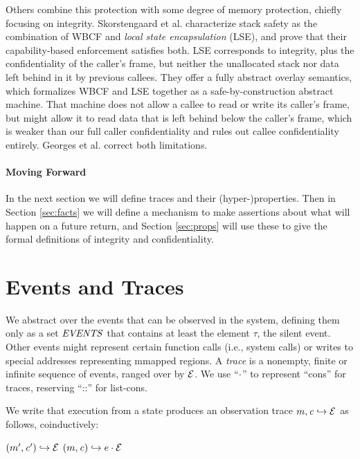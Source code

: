 \documentclass[10pt,conference]{ieeetran}%
\theoremstyle{definition}
\begin{document}
Others combine this protection with some degree of memory protection,
chiefly focusing on integrity. Skorstengaard et al. \cite{SkorstengaardSTK} characterize stack
safety as the combination of WBCF and {\it local state encapsulation} (LSE), and prove that their
capability-based enforcement satisfies both. LSE corresponds to integrity, plus the
confidentiality of the caller's frame, but neither the unallocated stack nor data left
behind in it by previous callees.
They offer a fully abstract overlay semantics, which formalizes WBCF and LSE
together as a safe-by-construction abstract machine. That machine does not allow a callee to
read or write its caller's frame, but might allow it to read data that is left behind below
the caller's frame, which is weaker than our full caller confidentiality and rules out
callee confidentiality entirely. Georges et al. \cite{Georges22:TempsDesCerises} correct
both limitations.

\paragraph*{Moving Forward}

In the next section we will define traces and their (hyper-)properties.
Then in Section \ref{sec:facts} we will define a mechanism to make assertions
about what will happen on a future return, and Section \ref{sec:props} will use these
to give the formal definitions of integrity and confidentiality.

\section{Events and Traces}
\label{sec:events}

We abstract over the events that can be observed in the system, defining them
only as a set \(\mathit{EVENTS}\) that contains at least the element \(\tau\), the silent
event. Other events might represent certain function calls (i.e., system calls)
or writes to special addresses representing mmapped regions.
A {\em trace} is a nonempty, finite or infinite sequence
of events, ranged over by \(\mathcal{E}\).
We use ``\(\cdot\)'' to represent ``cons'' for traces, reserving ``::''
for list-cons.

We write that execution from a state produces an observation trace
\(m,\mathit{c} \hookrightarrow \mathcal{E}\) as follows, coinductively:

            {\((m',\mathit{c}') \hookrightarrow \mathcal{E}\)}
            {\((m,\mathit{c}) \hookrightarrow e \cdot \mathcal{E}\)}
\end{document}
